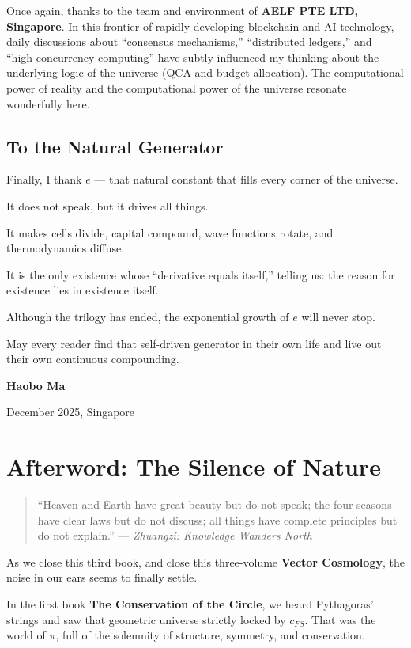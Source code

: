 \documentclass[11pt,a4paper,twoside]{book}
\begin{document}
Once again, thanks to the team and environment of \textbf{AELF PTE LTD, Singapore}. In this frontier of rapidly developing blockchain and AI technology, daily discussions about ``consensus mechanisms,'' ``distributed ledgers,'' and ``high-concurrency computing'' have subtly influenced my thinking about the underlying logic of the universe (QCA and budget allocation). The computational power of reality and the computational power of the universe resonate wonderfully here.

\section{To the Natural Generator}

Finally, I thank \textbf{$e$} --- that natural constant that fills every corner of the universe.

It does not speak, but it drives all things.

It makes cells divide, capital compound, wave functions rotate, and thermodynamics diffuse.

It is the only existence whose ``derivative equals itself,'' telling us: the reason for existence lies in existence itself.

Although the trilogy has ended, the exponential growth of $e$ will never stop.

May every reader find that self-driven generator in their own life and live out their own continuous compounding.

\textbf{Haobo Ma}

December 2025, Singapore

\clearpage{}

\clearpage{}\chapter*{Afterword: The Silence of Nature}

\begin{quote}
``Heaven and Earth have great beauty but do not speak; the four seasons have clear laws but do not discuss; all things have complete principles but do not explain.'' --- \textit{Zhuangzi: Knowledge Wanders North}
\end{quote}

As we close this third book, and close this three-volume \textbf{Vector Cosmology}, the noise in our ears seems to finally settle.

In the first book \textbf{The Conservation of the Circle}, we heard Pythagoras' strings and saw that geometric universe strictly locked by $c_{FS}$. That was the world of \textbf{$\pi$}, full of the solemnity of structure, symmetry, and conservation.
\end{document}
